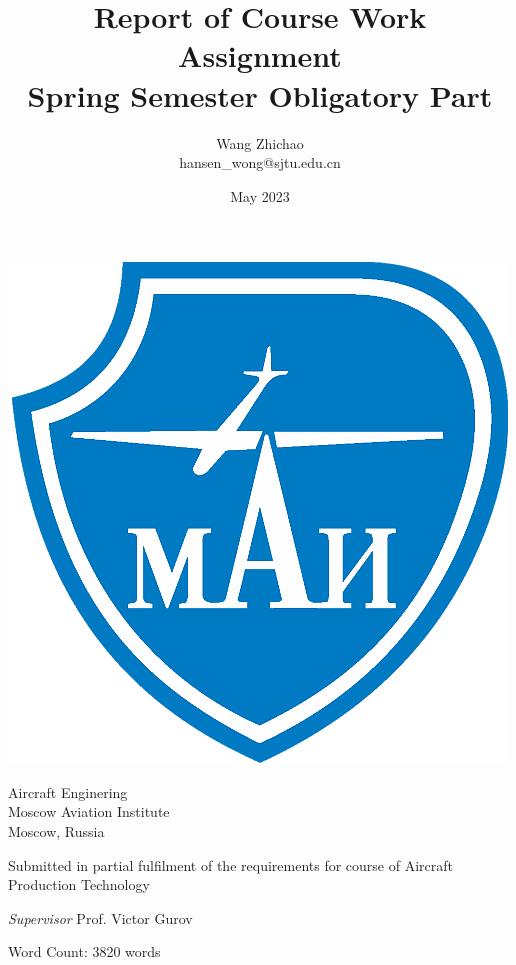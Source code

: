 \documentclass{article}
\title{Report of Course Work Assignment \\[1ex] \large Spring Semester Obligatory Part}
\author{Wang Zhichao \\ [1ex] hansen\_wong@sjtu.edu.cn}
\date{May 2023}
\begin{document}
\maketitle

\begin{center}
    \includegraphics[scale=0.35]{images/mai.png}

    \vspace{0.8cm}

    Aircraft Enginering\\
    Moscow Aviation Institute\\
    Moscow, Russia

    \vspace{0.8cm}

    Submitted in partial fulfilment of the requirements for course of Aircraft Production Technology

    \vspace{0.8cm}

    \textit{Supervisor} Prof. Victor Gurov 

    \vspace{0.8cm}

    Word Count: 3820 words
\end{center}

\pagebreak

\end{document}
